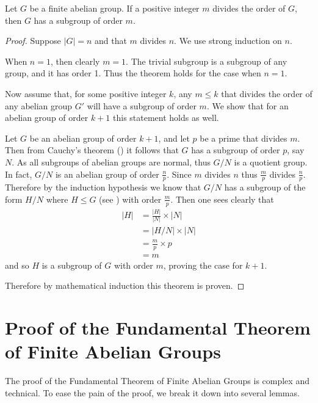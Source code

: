 \begin{theorem}
    Let $G$ be a finite abelian group. If a positive integer $m$ divides the order of $G$, then $G$ has a subgroup of order $m$.
\end{theorem}
\begin{proof}
    Suppose $|G| = n$ and that $m$ divides $n$. We use strong induction on $n$.

    When $n = 1$, then clearly $m = 1$. The trivial subgroup is a subgroup of any group, and it has order 1. Thus the theorem holds for the case when $n = 1$.

    Now assume that, for some positive integer $k$, any $m \leq k$ that divides the order of any abelian group $G'$ will have a subgroup of order $m$. We show that for an abelian group of order $k+1$ this statement holds as well.

    Let $G$ be an abelian group of order $k+1$, and let $p$ be a prime that divides $m$. Then from Cauchy's theorem () it follows that $G$ has a subgroup of order $p$, say $N$. As all subgroups of abelian groups are normal, thus $G/N$ is a quotient group. In fact, $G/N$ is an abelian group of order $\frac np$. Since $m$ divides $n$ thus $\frac mp$ divides $\frac np$. Therefore by the induction hypothesis we know that $G/N$ has a subgroup of the form $H/N$ where $H \leq G$ (see ) with order $\frac mp$. Then one sees clearly that
    \begin{align*}
        |H| &= \frac{|H|}{|N|} \times |N|\\
        &= |H/N| \times |N|\\
        &= \frac mp \times p\\
        &= m
    \end{align*}
    and so $H$ is a subgroup of $G$ with order $m$, proving the case for $k+1$.

    Therefore by mathematical induction this theorem is proven.
\end{proof}

\section{Proof of the Fundamental Theorem of Finite Abelian Groups}
The proof of the Fundamental Theorem of Finite Abelian Groups is complex and technical. To ease the pain of the proof, we break it down into several lemmas.

